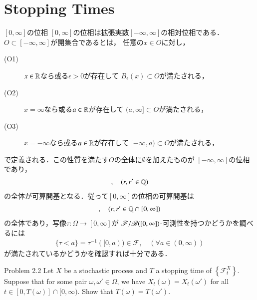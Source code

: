 \section{Stopping Times}
	\begin{itembox}[l]{$[0,\infty]$の位相}
		$[0,\infty]$の位相は拡張実数$[-\infty,\infty]$の相対位相である．
		$O \subset [-\infty,\infty]$が開集合であるとは，
		任意の$x \in O$に対し，
		\begin{description}
			\item[(O1)] $x \in \mathbb{R}$なら或る$\epsilon > 0$が存在して
				$B_\epsilon(x) \subset O$が満たされる，
			
			\item[(O2)] $x = \infty$なら或る$a \in \mathbb{R}$が存在して
				$(a,\infty] \subset O$が満たされる，
			
			\item[(O3)] $x = -\infty$なら或る$a \in \mathbb{R}$が存在して
				$[-\infty,a) \subset O$が満たされる，
		\end{description}
		で定義される．この性質を満たす$O$の全体に$\emptyset$を加えたものが
		$[-\infty,\infty]$の位相であり，
		\begin{align}
			[-\infty,r),\quad (r,r'), \quad (r,\infty],
			\quad (r,r' \in \Q)
		\end{align}
		の全体が可算開基となる．従って$[0,\infty]$の位相の可算開基は
		\begin{align}
			[0,r),\quad (r,r'), \quad (r,\infty],
			\quad (r,r' \in \Q \cap [0,\infty])
		\end{align}
		の全体であり，写像$\tau:\Omega \longrightarrow [0,\infty]$が
		$\mathscr{F}/\mathscr{B}([0,\infty])$-可測性を持つかどうかを調べるには
		\begin{align}
			\{\tau < a\} = \tau^{-1}([0,a)) \in \mathscr{F},
			\quad (\forall a \in (0,\infty))
		\end{align}
		が満たされているかどうかを確認すれば十分である．
	\end{itembox}
	
	\begin{itembox}[l]{Problem 2.2}
		Let $X$ be a stochastic process and $T$ a stopping time of 
		$\left\{ \mathscr{F}^X_t \right\}$. Suppose that for some pair $\omega,\omega' \in \Omega$, 
		we have $X_t(\omega) = X_t(\omega')$ for all $t \in [0,T(\omega)] \cap [0,\infty)$. 
		Show that $T(\omega) = T(\omega')$. 
	\end{itembox}
	

